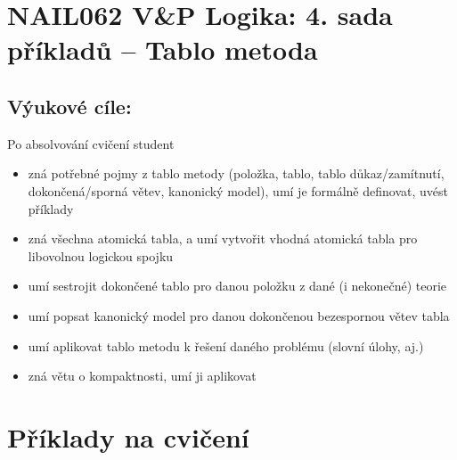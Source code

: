 \section*{NAIL062 V\&P Logika: 4. sada příkladů -- Tablo metoda}



\subsection*{Výukové cíle:} Po absolvování cvičení student

    \begin{itemize}\setlength{\itemsep}{0pt}
        \item zná potřebné pojmy z tablo metody (položka, tablo, tablo důkaz/zamítnutí, dokončená/sporná větev, kanonický model), umí je formálně definovat, uvést příklady
        \item zná všechna atomická tabla, a umí vytvořit vhodná atomická tabla pro libovolnou logickou spojku
        \item umí sestrojit dokončené tablo pro danou položku z dané (i nekonečné) teorie
        \item umí popsat kanonický model pro danou dokončenou bezespornou větev tabla
        \item umí aplikovat tablo metodu k řešení daného problému (slovní úlohy, aj.)
        \item zná větu o kompaktnosti, umí ji aplikovat
    \end{itemize}
    

\section*{Příklady na cvičení}


